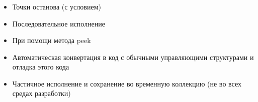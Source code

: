 \begin{frame}
\frametitle{\insertsection} 
\framesubtitle{\insertsubsection}
\begin{itemize}
	\item Точки останова (с условием)
	\item Последовательное исполнение
	\item При помощи метода peek
	\item Автоматическая конвертация в код с обычными управляющими структурами и отладка этого кода
	\item Частичное исполнение и сохранение во временную коллекцию (не во всех средах разработки)
\end{itemize}
\end{frame}
